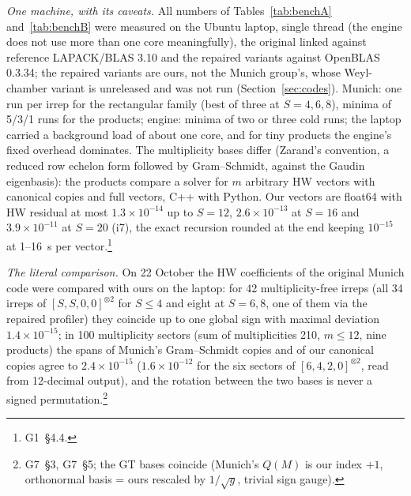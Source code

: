 \documentclass[11pt]{article}
\makeatletter
\renewcommand\subsection{\@startsection{subsection}{2}{\z@}{-2.0ex \@plus -1ex \@minus -.2ex}{0.6ex \@plus .2ex}{\normalfont\normalsize\bfseries}}
\newcommand{\rg}[2]{\textsf{G#1}~\S#2}
\makeatother
\begin{document}
\subsection{Caveats}\label{sec:caveats}

\emph{One machine, with its caveats.}
All numbers of Tables~\ref{tab:benchA} and~\ref{tab:benchB} were measured on the Ubuntu laptop, single thread (the engine does not use more than one core meaningfully), the original linked against reference LAPACK/BLAS 3.10 and the repaired variants against OpenBLAS 0.3.34; the repaired variants are ours, not the Munich group's, whose Weyl-chamber variant is unreleased and was not run (Section~\ref{sec:codes}).
Munich: one run per irrep for the rectangular family (best of three at $S=4,6,8$), minima of 5/3/1 runs for the products; engine: minima of two or three cold runs; the laptop carried a background load of about one core, and for tiny products the engine's fixed overhead dominates.
The multiplicity bases differ (Zarand's convention, a reduced row echelon form followed by Gram--Schmidt, against the Gaudin eigenbasis): the products compare a solver for $m$ arbitrary HW vectors with canonical copies and full vectors, C++ with Python.
Our vectors are float64 with HW residual at most $1.3\times10^{-14}$ up to $S=12$, $2.6\times10^{-13}$ at $S=16$ and $3.9\times10^{-11}$ at $S=20$ (i7), the exact recursion rounded at the end keeping $10^{-15}$ at 1--16~s per vector.\footnote{\rg{1}{4.4}.}

\emph{The literal comparison.}
On 22 October the HW coefficients of the original Munich code were compared with ours on the laptop: for 42 multiplicity-free irreps (all 34 irreps of $[S,S,0,0]^{\otimes2}$ for $S\le4$ and eight at $S=6,8$, one of them via the repaired profiler) they coincide up to one global sign with maximal deviation $1.4\times10^{-15}$; in 100 multiplicity sectors (sum of multiplicities 210, $m\le12$, nine products) the spans of Munich's Gram--Schmidt copies and of our canonical copies agree to $2.4\times10^{-15}$ ($1.6\times10^{-12}$ for the six sectors of $[6,4,2,0]^{\otimes2}$, read from 12-decimal output), and the rotation between the two bases is never a signed permutation.\footnote{\rg{7}{3}, \rg{7}{5}; the GT bases coincide (Munich's $Q(M)$ is our index $+1$, orthonormal basis = ours rescaled by $1/\sqrt g$, trivial sign gauge).}
\end{document}
